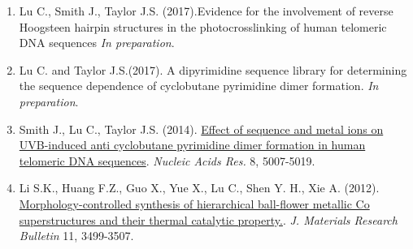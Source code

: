 

\begin{cvparagraph}

\begin{enumerate}
\item Lu C., Smith J., Taylor J.S. (2017).{Evidence for the involvement of reverse Hoogsteen hairpin structures in the photocrosslinking of human telomeric DNA sequences}
  \textit{In preparation}.
\item Lu C. and Taylor J.S.(2017).
  {A dipyrimidine sequence library for determining the sequence dependence of cyclobutane pyrimidine dimer formation}.
  \textit{In preparation}.
\item Smith J., Lu C., Taylor J.S.  (2014).
  \href{https://academic.oup.com/nar/article/42/8/5007/1075895/Effect-of-sequence-and-metal-ions-on-UVB-induced}{Effect of sequence and metal ions on UVB-induced anti cyclobutane pyrimidine dimer formation in human telomeric DNA sequences}.
  \textit{Nucleic Acids Res.} 8, 5007-5019.
\item Li S.K., Huang F.Z., Guo X., Yue X., Lu C., Shen Y. H., Xie A. (2012).
  \href{http://www.sciencedirect.com.libproxy.wustl.edu/science/article/pii/S0025540812005090}{Morphology-controlled synthesis of hierarchical ball-flower metallic Co superstructures and their thermal catalytic property.}.
  \textit{J. Materials Research Bulletin} 11, 3499-3507.
\end{enumerate}
\end{cvparagraph}
